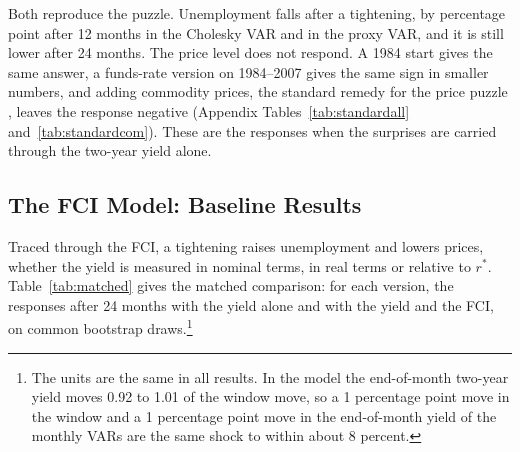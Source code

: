 \documentclass[11pt]{article}
\newcommand{\rs}{r^{*}}
\begin{document}


Both reproduce the puzzle. Unemployment falls after a tightening, by  percentage point after 12 months in the Cholesky VAR and  in the proxy VAR, and it is still lower after 24 months. The price level does not respond. A 1984 start gives the same answer, a funds-rate version on 1984--2007 gives the same sign in smaller numbers, and adding commodity prices, the standard remedy for the price puzzle \citep{sims1992,ramey2016}, leaves the response negative (Appendix Tables~\ref{tab:standardall} and~\ref{tab:standardcom}). These are the responses when the surprises are carried through the two-year yield alone.

\subsection{The FCI Model: Baseline Results}\label{sec:baseline}
Traced through the FCI, a tightening raises unemployment and lowers prices, whether the yield is measured in nominal terms, in real terms or relative to $\rs$. Table~\ref{tab:matched} gives the matched comparison: for each version, the responses after 24 months with the yield alone and with the yield and the FCI, on common bootstrap draws.\footnote{The units are the same in all results. In the model the end-of-month two-year yield moves 0.92 to 1.01 of the window move, so a 1 percentage point move in the window and a 1 percentage point move in the end-of-month yield of the monthly VARs are the same shock to within about 8 percent.}


\end{document}
